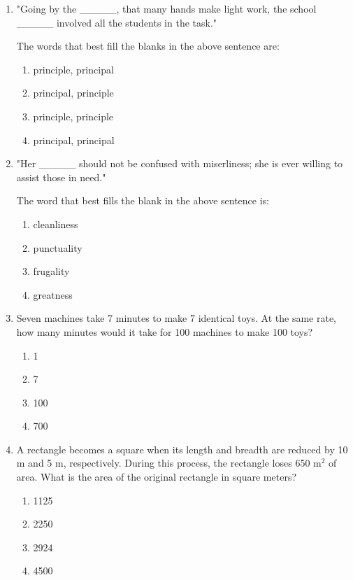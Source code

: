 \documentclass[journal,9pt,onecolumn]{IEEEtran}
\begin{document}
\begin{enumerate}

\item "Going by the \_\_\_\_\_, that many hands make light work, the school \_\_\_\_\_ involved all the students in the task."

The words that best fill the blanks in the above sentence are: \hfill {}

\begin{multicols}{2}
\begin{enumerate}
    \item principle, principal
    \item principal, principle
    \item principle, principle
    \item principal, principal
\end{enumerate}
\end{multicols}

\item "Her \_\_\_\_\_ should not be confused with miserliness; she is ever willing to assist those in need."

The word that best fills the blank in the above sentence is: \hfill {}

\begin{multicols}{4}
\begin{enumerate}
    \item cleanliness
    \item punctuality
    \item frugality
    \item greatness
\end{enumerate}
\end{multicols}


\item Seven machines take 7 minutes to make 7 identical toys. At the same rate, how many minutes would it take for 100 machines to make 100 toys? \hfill {}

\begin{multicols}{4}
\begin{enumerate}
    \item 1
    \item 7
    \item 100
    \item 700
\end{enumerate}
\end{multicols}


\item A rectangle becomes a square when its length and breadth are reduced by 10 m and 5 m, respectively. During this process, the rectangle loses 650 m$^2$ of area. What is the area of the original rectangle in square meters?
\hfill {}
\begin{multicols}{4}
\begin{enumerate}
    \item 1125
    \item 2250
    \item 2924
    \item 4500
\end{enumerate}
\end{multicols}


\end{enumerate}
\end{document}
